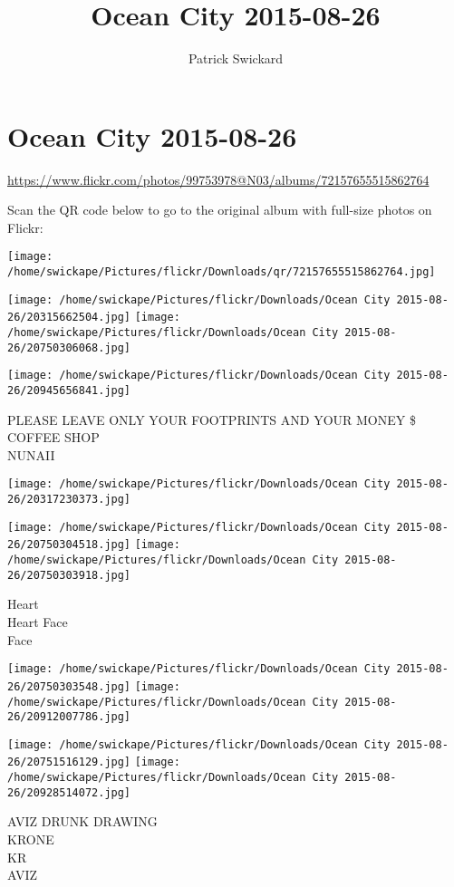 \documentclass[10pt,letterpaper]{article}
\title{Ocean City 2015-08-26}
\author{Patrick Swickard}
\date{}
\begin{document}
\section*{Ocean City 2015-08-26}

\url{https://www.flickr.com/photos/99753978@N03/albums/72157655515862764}

Scan the QR code below to go to the original album with full-size photos on Flickr:

\texttt{[image: /home/swickape/Pictures/flickr/Downloads/qr/72157655515862764.jpg]}
\pagebreak

\texttt{[image: /home/swickape/Pictures/flickr/Downloads/Ocean City 2015-08-26/20315662504.jpg]}
\texttt{[image: /home/swickape/Pictures/flickr/Downloads/Ocean City 2015-08-26/20750306068.jpg]}

\texttt{[image: /home/swickape/Pictures/flickr/Downloads/Ocean City 2015-08-26/20945656841.jpg]}

PLEASE LEAVE ONLY YOUR FOOTPRINTS AND YOUR MONEY \$\\
COFFEE SHOP\\
NUNAII
\pagebreak

\texttt{[image: /home/swickape/Pictures/flickr/Downloads/Ocean City 2015-08-26/20317230373.jpg]}

\vspace{0.25in}
\texttt{[image: /home/swickape/Pictures/flickr/Downloads/Ocean City 2015-08-26/20750304518.jpg]}
\texttt{[image: /home/swickape/Pictures/flickr/Downloads/Ocean City 2015-08-26/20750303918.jpg]}

Heart\\
Heart Face\\
Face
\pagebreak

\texttt{[image: /home/swickape/Pictures/flickr/Downloads/Ocean City 2015-08-26/20750303548.jpg]}
\texttt{[image: /home/swickape/Pictures/flickr/Downloads/Ocean City 2015-08-26/20912007786.jpg]}

\texttt{[image: /home/swickape/Pictures/flickr/Downloads/Ocean City 2015-08-26/20751516129.jpg]}
\texttt{[image: /home/swickape/Pictures/flickr/Downloads/Ocean City 2015-08-26/20928514072.jpg]}

AVIZ DRUNK DRAWING\\
KRONE\\
KR\\
AVIZ
\pagebreak
\end{document}
